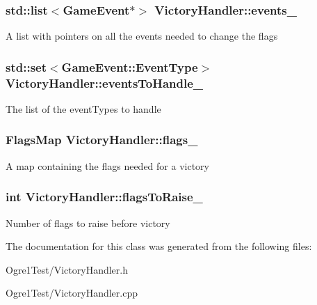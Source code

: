 \subsubsection[{\texorpdfstring{events\+\_\+}{events_}}]{\setlength{\rightskip}{0pt plus 5cm}std\+::list$<${\bf Game\+Event}$\ast$$>$ Victory\+Handler\+::events\+\_\+\hspace{0.3cm}{\ttfamily [protected]}}\hypertarget{class_victory_handler_a632e68ca2b6ffd913d5e27fc33f08123}{}\label{class_victory_handler_a632e68ca2b6ffd913d5e27fc33f08123}
A list with pointers on all the events needed to change the flags 
\subsubsection[{\texorpdfstring{events\+To\+Handle\+\_\+}{eventsToHandle_}}]{\setlength{\rightskip}{0pt plus 5cm}std\+::set$<$Game\+Event\+::\+Event\+Type$>$ Victory\+Handler\+::events\+To\+Handle\+\_\+\hspace{0.3cm}{\ttfamily [protected]}}\hypertarget{class_victory_handler_ad77dbdde03da886a905c4daa274c4a0a}{}\label{class_victory_handler_ad77dbdde03da886a905c4daa274c4a0a}
The list of the event\+Types to handle 
\subsubsection[{\texorpdfstring{flags\+\_\+}{flags_}}]{\setlength{\rightskip}{0pt plus 5cm}Flags\+Map Victory\+Handler\+::flags\+\_\+\hspace{0.3cm}{\ttfamily [protected]}}\hypertarget{class_victory_handler_a01fcaa39ade4234c761326e1f262b822}{}\label{class_victory_handler_a01fcaa39ade4234c761326e1f262b822}
A map containing the flags needed for a victory 
\subsubsection[{\texorpdfstring{flags\+To\+Raise\+\_\+}{flagsToRaise_}}]{\setlength{\rightskip}{0pt plus 5cm}int Victory\+Handler\+::flags\+To\+Raise\+\_\+\hspace{0.3cm}{\ttfamily [protected]}}\hypertarget{class_victory_handler_ad692ca6b37d7e31e0b1bb8903a30d4f0}{}\label{class_victory_handler_ad692ca6b37d7e31e0b1bb8903a30d4f0}
Number of flags to raise before victory 

The documentation for this class was generated from the following files\+:\begin{DoxyCompactItemize}
\item 
Ogre1\+Test/Victory\+Handler.\+h\item 
Ogre1\+Test/Victory\+Handler.\+cpp\end{DoxyCompactItemize}
